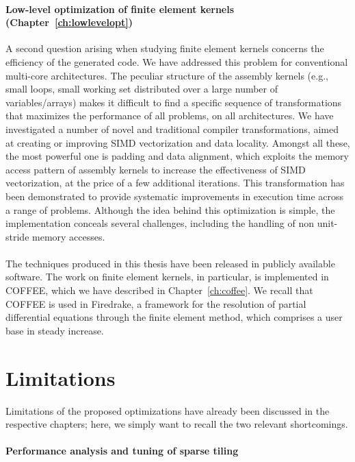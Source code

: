 \paragraph{Low-level optimization of finite element kernels (Chapter~\ref{ch:lowlevelopt})}
A second question arising when studying finite element kernels concerns the efficiency of the generated code. We have addressed this problem for conventional multi-core architectures. The peculiar structure of the assembly kernels (e.g., small loops, small working set distributed over a large number of variables/arrays) makes it difficult to find a specific sequence of transformations that maximizes the performance of all problems, on all architectures. We have investigated a number of novel and traditional compiler transformations, aimed at creating or improving SIMD vectorization and data locality. Amongst all these, the most powerful one is padding and data alignment, which exploits the memory access pattern of assembly kernels to increase the effectiveness of SIMD vectorization, at the price of a few additional iterations. This transformation has been demonstrated to provide systematic improvements in execution time across a range of problems. Although the idea behind this optimization is simple, the implementation conceals several challenges, including the handling of non unit-stride memory accesses.
~\\ 
~\\
The techniques produced in this thesis have been released in publicly available software. The work on finite element kernels, in particular, is implemented in COFFEE, which we have described in Chapter~\ref{ch:coffee}. We recall that COFFEE is used in Firedrake, a framework for the resolution of partial differential equations through the finite element method, which comprises a user base in steady increase.

\section{Limitations}
Limitations of the proposed optimizations have already been discussed in the respective chapters; here, we simply want to recall the two relevant shortcomings.
 
\paragraph{Performance analysis and tuning of sparse tiling}

